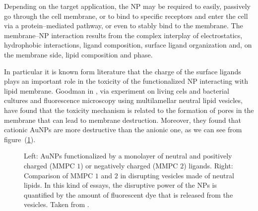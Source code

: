 Depending on the target application, the \ac{NP} may be required to easily, passively go through the cell membrane, or to bind to specific receptors and enter the cell via a protein--mediated pathway, or even to stably bind to the membrane. The membrane--\ac{NP} interaction results from the complex interplay of electrostatics, hydrophobic interactions, ligand composition, surface ligand organization and, on the membrane side, lipid composition and phase.

In particular it is known form literature that the charge of the surface ligands plays an important role in the toxicity of the functionalized \ac{NP} interacting with lipid membrane. Goodman \etal{} in \cite{Goodman2004}, via experiment on living cels and bacterial cultures and fluorescence microscopy using multilamellar neutral lipid vesicles, have found that the toxicity mechanism is related to the formation of pores in the membrane that can lead to membrane destruction. Moreover, they found that cationic \acp{AuNP} are more destructive than the anionic one, as we can see from figure~(\ref{fig:goodman}).
\begin{figure}[ht]
	\centering
	\qquad\qquad%
	\caption{Left: \acp{AuNP} functionalized by a monolayer of neutral and positively charged (MMPC $1$) or negatively charged (MMPC $2$) ligands. Right: Comparison of MMPC $1$ and $2$ in disrupting vesicles made of neutral lipids. In this kind of essays, the disruptive power of the \acp{NP} is quantified by the amount of fluorescent dye that is released from the vesicles. Taken from \cite{Goodman2004}.}%
	\label{fig:goodman}
\end{figure}

